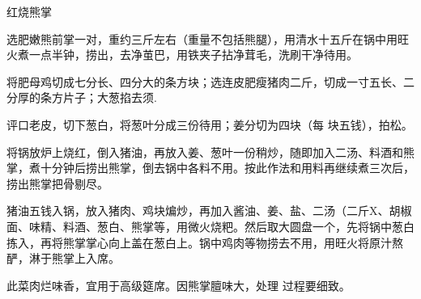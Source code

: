 \begin{recipe}{红烧熊掌}

\ingredients


\cooking

\step 选肥嫩熊前掌一对，重约三斤左右（重量不包括熊腿），用清水十五斤在锅中用旺火煮一点半钟，捞出，去净茧巴，用铁夹子拈净茸毛，洗刷干净待用。

\step 将肥母鸡切成七分长、四分大的条方块；选连皮肥瘦猪肉二斤，切成一寸五长、二分厚的条方片子；大葱掐去须.

评口老皮，切下葱白，将葱叶分成三份待用；姜分切为四块（每 块五钱），拍松。

\step 将锅放炉上烧红，倒入猪油，再放入姜、葱叶一份稍炒，随即加入二汤、料酒和熊掌，煮十分钟后捞出熊掌，倒去锅中各料不用。按此作法和用料再继续煮三次后，捞出熊掌把骨剔尽。

\step 猪油五钱入锅，放入猪肉、鸡块煸炒，再加入酱油、姜、盐、二汤（二斤X、胡椒面、味精、料酒、葱白、熊掌等，用微火烧粑。然后取大圆盘一个，先将锅中葱白拣入，再将熊掌掌心向上盖在葱白上。锅中鸡肉等物捞去不用，用旺火将原汁熬酽，淋于熊掌上入席。

\notes

此菜肉烂味香，宜用于高级筵席。因熊掌膻味大，处理 过程要细致。

\end{recipe}

